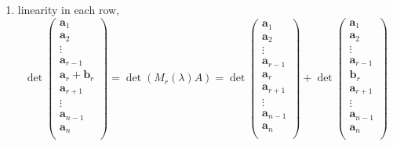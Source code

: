 \begin{enumerate}
    \item linearity in each row,
    \[
        \det{
            \begin{pmatrix}
                \bm a_1\\
                \bm a_2\\
                \vdots\\
                \bm a_{r-1}\\
                \bm a_r+\bm b_r\\
                \bm a_{r+1}\\
                \vdots\\
                \bm a_{n-1}\\
                \bm a_n\\
            \end{pmatrix}
        }
        =\det{(M_r(\lambda)A)}=
        \det{
            \begin{pmatrix}
                \bm a_1\\
                \bm a_2\\
                \vdots\\
                \bm a_{r-1}\\
                \bm a_r\\
                \bm a_{r+1}\\
                \vdots\\
                \bm a_{n-1}\\
                \bm a_n\\
            \end{pmatrix}
        }
        +
        \det{
            \begin{pmatrix}
                \bm a_1\\
                \bm a_2\\
                \vdots\\
                \bm a_{r-1}\\
                \bm b_r\\
                \bm a_{r+1}\\
                \vdots\\
                \bm a_{n-1}\\
                \bm a_n\\
            \end{pmatrix}
        }
    \]
    

\end{enumerate}

